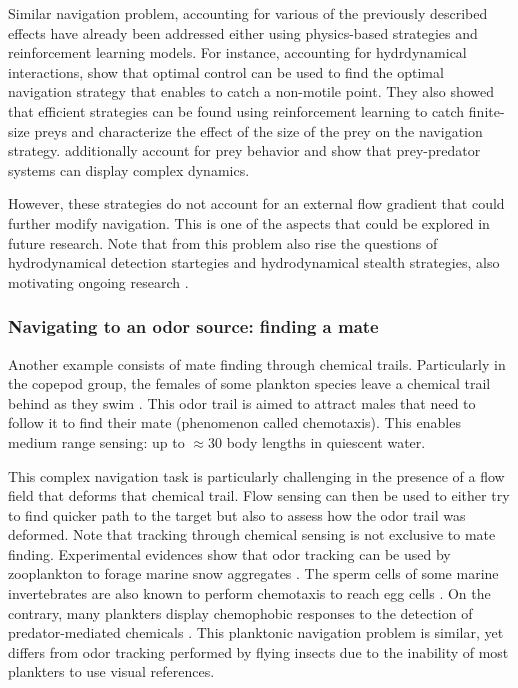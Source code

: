 Similar navigation problem, accounting for various of the previously described effects have already been addressed either using physics-based strategies and reinforcement learning models.
For instance, accounting for hydrdynamical interactions, \citet{zhu2022optimising} show that optimal control can be used to find the optimal navigation strategy that enables to catch a non-motile point. 
They also showed that efficient strategies can be found using reinforcement learning to catch finite-size preys and characterize the effect of the size of the prey on the navigation strategy.
\citet{borra2022reinforcement} additionally account for prey behavior and show that prey-predator systems can display complex dynamics.

However, these strategies do not account for an external flow gradient that could further modify navigation.
This is one of the aspects that could be explored in future research.
Note that from this problem also rise the questions of hydrodynamical detection startegies and hydrodynamical stealth strategies, also motivating ongoing research \citep{ren2021bluff}.

\subsubsection{Navigating to an odor source: finding a mate}

Another example consists of mate finding through chemical trails.
Particularly in the copepod group, the females of some plankton species leave a chemical trail behind as they swim \citep{weissburg1998following, bagoien2005blind, yen2010chemical}.
This odor trail is aimed to attract males that need to follow it to find their mate (phenomenon called chemotaxis).
This enables medium range sensing: up to $\approx 30$ body lengths \citep{bagoien2005blind} in quiescent water.

This complex navigation task is particularly challenging in the presence of a flow field that deforms that chemical trail.
Flow sensing can then be used to either try to find quicker path to the target but also to assess how the odor trail was deformed.
Note that tracking through chemical sensing is not exclusive to mate finding.
Experimental evidences show that odor tracking can be used by zooplankton to forage marine snow aggregates \citep{lombard2013copepods}.
The sperm cells of some marine invertebrates are also known to perform chemotaxis to reach egg cells \citep{lange2021sperm}.
On the contrary, many plankters display chemophobic responses to the detection of predator-mediated chemicals \citep{hay2009marine}.
This planktonic  navigation problem is similar, yet differs from odor tracking performed by flying insects \citep{carde2008navigational, willis2011role} due to the inability of most plankters to use visual references.

